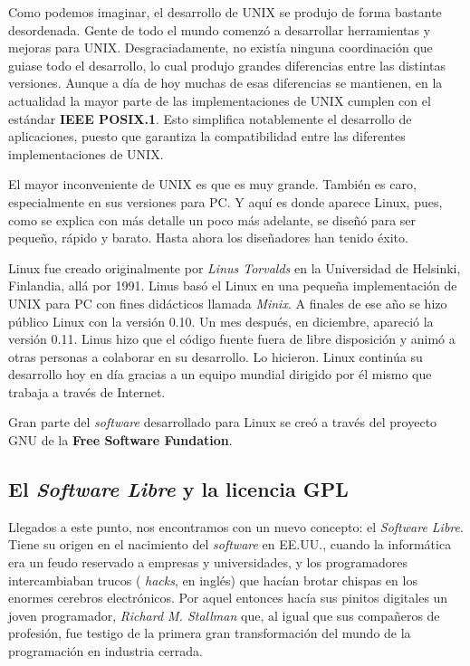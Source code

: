 Como  podemos imaginar,  el desarrollo  de  UNIX se  produjo de  forma
bastante desordenada.  Gente de  todo el  mundo comenzó  a desarrollar
herramientas y mejoras para UNIX. Desgraciadamente, no existía ninguna
coordinación que  guiase todo el  desarrollo, lo cual  produjo grandes
diferencias entre las distintas versiones.  Aunque a día de hoy muchas
de esas diferencias  se mantienen, en la actualidad la  mayor parte de
las  implementaciones  de  UNIX  cumplen con  el  estándar  {\bf  IEEE
POSIX.1}.  Esto  simplifica  notablemente  el  desarrollo
de  aplicaciones, puesto  que  garantiza la  compatibilidad entre  las
diferentes implementaciones de UNIX.

El mayor inconveniente de UNIX es  que es muy grande. También es caro,
especialmente en sus versiones para PC. Y aquí es donde aparece Linux,
pues, como se explica con más  detalle un poco más adelante, se diseñó
para ser  pequeño, rápido  y barato. Hasta  ahora los  diseñadores han
tenido éxito.

Linux fue  creado originalmente  por {\em  Linus Torvalds} en  la Universidad  de Helsinki,  Finlandia, allá  por 1991.
Linus basó el Linux en una  pequeña implementación de UNIX para PC con
fines didácticos  llamada {\em  Minix}. A finales  de ese
año se  hizo público  Linux con  la versión 0.10.  Un mes  después, en
diciembre, apareció la  versión 0.11. Linus hizo que  el código fuente
fuera de libre disposición y animó  a otras personas a colaborar en su
desarrollo.  Lo hicieron.  Linux  continúa su  desarrollo  hoy en  día
gracias a un equipo mundial dirigido por él mismo que trabaja a través
de Internet.

Gran   parte   del  {\em   software}   desarrollado   para  Linux   se
creó   a  través   del  proyecto   GNU  de   la  {\bf   Free  Software
Fundation}.

\subsection{El {\em Software Libre} y la licencia GPL}

Llegados a este punto, nos encontramos  con un nuevo concepto: el {\em
Software Libre}. Tiene  su origen en el nacimiento  del {\em software}
en EE.UU.,  cuando la  informática era un  feudo reservado  a empresas
y  universidades,  y  los programadores  intercambiaban  trucos  ({\em
hacks}, en inglés)  que hacían brotar chispas en  los enormes cerebros
electrónicos. Por aquel entonces hacía  sus pinitos digitales un joven
programador, {\em Richard M. Stallman} que,
al igual  que sus compañeros de  profesión, fue testigo de  la primera
gran transformación del mundo de la programación en industria cerrada.

